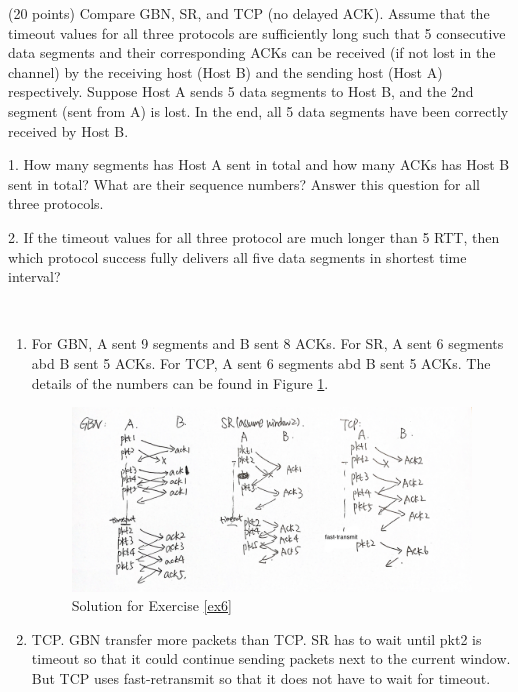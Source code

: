\begin{exercise}[]{(20 points) Compare GBN, SR, and TCP (no delayed ACK). Assume that the timeout values for all three protocols are sufficiently long such that 5 consecutive data segments and their corresponding ACKs can be received (if not lost in the channel) by the receiving host (Host B) and the sending host (Host A) respectively. Suppose Host A sends 5 data segments to Host B, and the 2nd segment (sent from A) is lost. In the end, all 5 data segments have been correctly received by Host B.

    1. How many segments has Host A sent in total and how many ACKs has Host B sent in total? What are their sequence numbers? Answer this question for all three protocols.

    2. If the timeout values for all three protocol are much longer than 5 RTT, then which protocol success fully delivers all five data segments in shortest time interval?}
  \begin{solution}
  \par{~}
  \begin{enumerate}
      \item For GBN, A sent 9 segments and B sent 8 ACKs. For SR, A sent 6 segments abd B sent 5 ACKs. For TCP, A sent 6 segments abd B sent 5 ACKs. The details of the numbers can be found in Figure \ref{fig:ex6}.
      \begin{figure}[hb]
        \begin{center}
        \includegraphics[width=12cm]{img/ass3/ex6}
        \caption{Solution for Exercise \ref{ex6}}
        \label{fig:ex6}
        \end{center}
      \end{figure}
      \item TCP. GBN transfer more packets than TCP. SR has to wait until pkt2 is timeout so that it could continue sending packets next to the current window. But TCP uses fast-retransmit so that it does not have to wait for timeout.
  \end{enumerate}
  \end{solution}
  \label{ex6}
\end{exercise}





